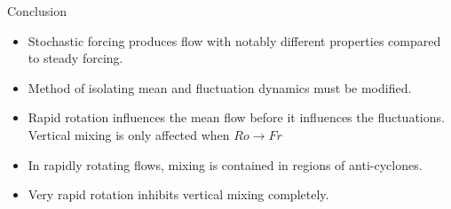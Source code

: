 \documentclass{beamer}
\begin{document}
\begin{frame}{Conclusion}

    \begin{itemize}
        \item Stochastic forcing produces flow with notably different properties compared to steady forcing.
        \item Method of isolating mean and fluctuation dynamics must be modified.
        \item Rapid rotation influences the mean flow before it influences the fluctuations. Vertical mixing is only affected when $Ro \to Fr$
        \item In rapidly rotating flows, mixing is contained in regions of anti-cyclones.
        \item Very rapid rotation inhibits vertical mixing completely.
    \end{itemize}

\end{frame}

{\scriptsize


}
\end{document}
